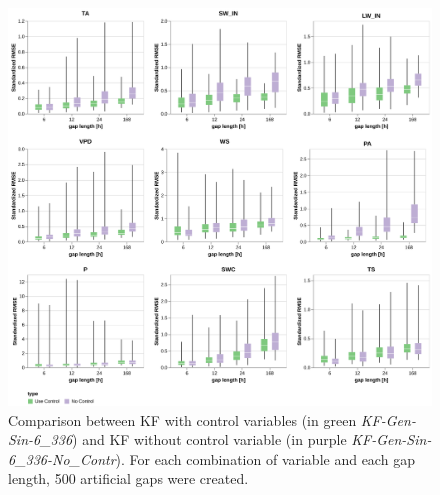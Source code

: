 \documentclass{article}
\newcommand{\imgwidth}{6in}
\begin{document}



\begin{figure}
\centerline{\includegraphics[width=\imgwidth]{images2/use_control.png}}
\caption{Comparison between KF with control variables (in green \textit{KF-Gen-Sin-6\_336}) and KF without control variable (in purple \textit{KF-Gen-Sin-6\_336-No\_Contr}). For each combination of variable and each gap length, 500 artificial gaps were created.}
\label{fig:control}
\end{figure}
\end{document}
